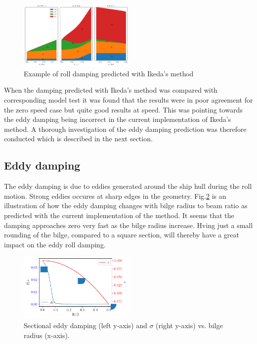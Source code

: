     

    
    \begin{figure}[H]
        \begin{center}\includegraphics[width = 0.5\textwidth]{figures/ikeda_generic.pdf}\end{center}
        \vspace{-1cm}
        \caption{Example of roll damping predicted with Ikeda's method}
        \label{fig:ikeda_generic}
    \end{figure}
    
    When the damping predicted with Ikeda's method was compared with
corresponding model test it was found that the results were in poor
agreement for the zero speed case but quite good results at speed. This
was pointing towards the eddy damping being incorrect in the current
implementation of Ikeda's method. A thorough investigation of the eddy
damping prediction was therefore conducted which is described in the
next section.

    \subsection*{Eddy damping}\label{eddy-damping}

The eddy damping is due to eddies generated around the ship hull during
the roll motion. Strong eddies occures at sharp edges in the geometry.
Fig.\ref{fig:eddy_sigma} is an illustration of how the eddy
damping changes with bilge radius to beam ratio as predicted with the
current implementation of the method. It seems that the damping
approaches zero very fast as the bilge radius increase. Hving just a
small rounding of the bilge, compared to a square section, will thereby
have a great impact on the eddy roll damping.

    

    \begin{figure}[H]
        \begin{center}\includegraphics[width = 0.5\textwidth]{figures/eddy_sigma.pdf}\end{center}
        \vspace{-1cm}
        \caption{Sectional eddy damping (left y-axis) and $\sigma$ (right y-axis) vs. bilge radius (x-axis).}
        \label{fig:eddy_sigma}
    \end{figure}
    
